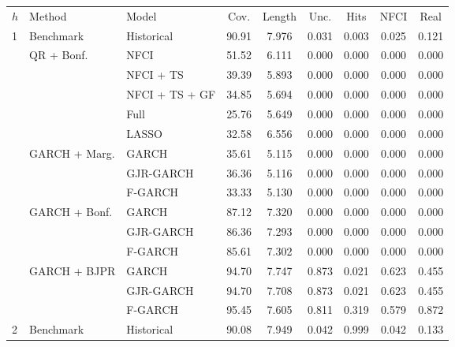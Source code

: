 \begin{tabular}{llp{10em}cccccc}
  \toprule
{$h$} & {Method} & {Model} & {Cov.} &
  {Length} & {Unc.} & {Hits} & {NFCI} & {Real} \\
    \cmidrule{1-1} \cmidrule(lr){2-3}  \cmidrule(lr){4-5} \cmidrule(lr){6-9}

\multirow{15}{*}{{1}} &
                      \multirow{1}{*}{{Benchmark}} & Historical & 90.91 & 7.976 & 0.031 & 0.003 & 0.025 & 0.121 \\  \cmidrule(lr){2-3} \cmidrule(lr){4-5} \cmidrule(lr){6-9}
& \multirow{5}{*}{{QR + Bonf.}} &   NFCI & 51.52 & 6.111 & 0.000 & 0.000 & 0.000 & 0.000 \\ 
& &   NFCI + TS & 39.39 & 5.893 & 0.000 & 0.000 & 0.000 & 0.000 \\ 
& &   NFCI + TS + GF  & 34.85 & 5.694 & 0.000 & 0.000 & 0.000 & 0.000 \\ 
& &   Full & 25.76 & 5.649 & 0.000 & 0.000 & 0.000 & 0.000 \\ 
& &   LASSO & 32.58 & 6.556 & 0.000 & 0.000 & 0.000 & 0.000 \\  \cmidrule(lr){2-3} \cmidrule(lr){4-5} \cmidrule(lr){6-9}
& \multirow{3}{*}{{GARCH + Marg.}} &    GARCH  & 35.61 & 5.115 & 0.000 & 0.000 & 0.000 & 0.000 \\ 
& &   GJR-GARCH  & 36.36 & 5.116 & 0.000 & 0.000 & 0.000 & 0.000 \\ 
& &   F-GARCH  & 33.33 & 5.130 & 0.000 & 0.000 & 0.000 & 0.000 \\  \cmidrule(lr){2-3} \cmidrule(lr){4-5} \cmidrule(lr){6-9}
& \multirow{3}{*}{{GARCH + Bonf.}} &    GARCH  & 87.12 & 7.320 & 0.000 & 0.000 & 0.000 & 0.000 \\ 
& &   GJR-GARCH  & 86.36 & 7.293 & 0.000 & 0.000 & 0.000 & 0.000 \\ 
& &   F-GARCH  & 85.61 & 7.302 & 0.000 & 0.000 & 0.000 & 0.000 \\  \cmidrule(lr){2-3} \cmidrule(lr){4-5} \cmidrule(lr){6-9}
& \multirow{3}{*}{{GARCH + BJPR}} &    GARCH  & 94.70 & 7.747 & 0.873 & 0.021 & 0.623 & 0.455 \\ 
& &   GJR-GARCH  & 94.70 & 7.708 & 0.873 & 0.021 & 0.623 & 0.455 \\ 
& &   F-GARCH  & 95.45 & 7.605 & 0.811 & 0.319 & 0.579 & 0.872 \\ 
\toprule
\multirow{15}{*}{{2}} &
                      \multirow{1}{*}{{Benchmark}} & Historical & 90.08 & 7.949 & 0.042 & 0.999 & 0.042 & 0.133 \\  \cmidrule(lr){2-3} \cmidrule(lr){4-5} \cmidrule(lr){6-9}

\end{tabular}

